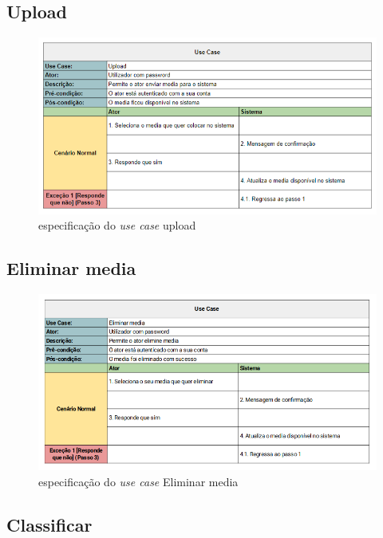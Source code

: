 \documentclass[a4paper]{report}
\begin{document}
\subsection{Upload}

\begin{figure}[H]
	\centering 
    \includegraphics[width=\textwidth]{images/upload.png}  
    \caption{especificação do \emph{use case} upload}
\end{figure}

\subsection{Eliminar media}

\begin{figure}[H]
	\centering 
    \includegraphics[width=\textwidth]{images/Eliminar_media.png}  
    \caption{especificação do \emph{use case} Eliminar media}
\end{figure}

\subsection{Classificar}
\end{document}
